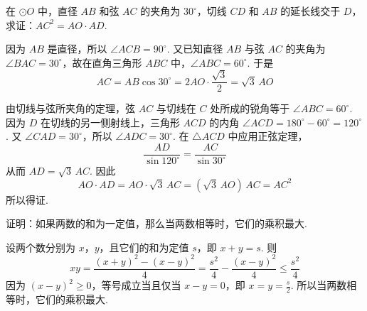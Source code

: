 \begin{problem}
在 \(\odot O\) 中，直径 \(AB\) 和弦 \(AC\) 的夹角为 \(30^\circ\)，切线 \(CD\) 和 \(AB\) 的延长线交于 \(D\)，求证：\(AC^2=AO\cdot AD\).

\end{problem}

\begin{solution}
因为 \(AB\) 是直径，所以 \(\angle ACB=90^\circ\). 又已知直径 \(AB\) 与弦 \(AC\) 的夹角为 \(\angle BAC=30^\circ\)，故在直角三角形 \(ABC\) 中，\(\angle ABC=60^\circ\). 于是
\[
AC=AB\cos30^\circ=2AO\cdot\frac{\sqrt3}{2}=\sqrt3\,AO
\]

由切线与弦所夹角的定理，弦 \(AC\) 与切线在 \(C\) 处所成的锐角等于 \(\angle ABC=60^\circ\). 因为 \(D\) 在切线的另一侧射线上，三角形 \(ACD\) 的内角 \(\angle ACD=180^\circ-60^\circ=120^\circ\). 又 \(\angle CAD=30^\circ\)，所以 \(\angle ADC=30^\circ\). 在 \(\triangle ACD\) 中应用正弦定理，
\[
\frac{AD}{\sin120^\circ}=\frac{AC}{\sin30^\circ}
\]
从而 \(AD=\sqrt3\,AC\). 因此
\[
AO\cdot AD=AO\cdot\sqrt3\,AC=(\sqrt3\,AO)\,AC=AC^2
\]
所以得证.
\end{solution}

\begin{problem}
证明：如果两数的和为一定值，那么当两数相等时，它们的乘积最大.
\end{problem}

\begin{solution}
设两个数分别为 \(x\)，\(y\)，且它们的和为定值 \(s\)，即 \(x+y=s\). 则
\[
xy=\frac{(x+y)^2-(x-y)^2}{4}=\frac{s^2}{4}-\frac{(x-y)^2}{4}\leq\frac{s^2}{4}
\]
因为 \((x-y)^2\geq0\)，等号成立当且仅当 \(x-y=0\)，即 \(x=y=\frac{s}{2}\). 所以当两数相等时，它们的乘积最大.
\end{solution}
